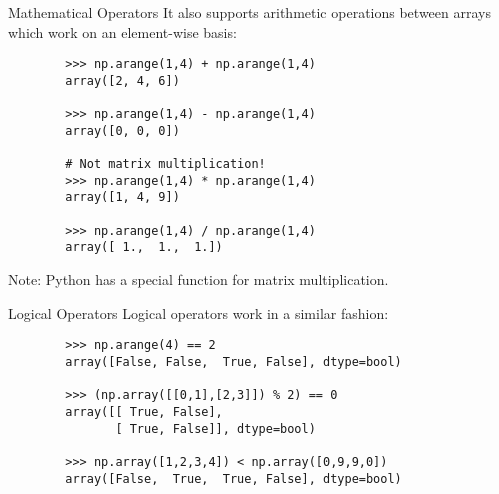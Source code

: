 \documentclass[serif,xcolor=pdftex,dvipsnames,table,hyperref={bookmarks=false,breaklinks}]{beamer}
\begin{document}
\begin{frame}[t,fragile]{Mathematical Operators}
	It also supports arithmetic operations between arrays which work on an element-wise basis:
	
	\pause
	\begin{lstlisting}
		>>> np.arange(1,4) + np.arange(1,4)
		array([2, 4, 6])
		
		>>> np.arange(1,4) - np.arange(1,4)
		array([0, 0, 0])
		
		# Not matrix multiplication!
		>>> np.arange(1,4) * np.arange(1,4)
		array([1, 4, 9])
		
		>>> np.arange(1,4) / np.arange(1,4)
		array([ 1.,  1.,  1.])
	\end{lstlisting}
	
	\pause
	Note: Python has a special function for matrix multiplication.
\end{frame}


\begin{frame}[t,fragile]{Logical Operators}
	Logical operators work in a similar fashion:
	
	\pause
	\begin{lstlisting}
		>>> np.arange(4) == 2
		array([False, False,  True, False], dtype=bool)
		
		>>> (np.array([[0,1],[2,3]]) % 2) == 0
		array([[ True, False],
		       [ True, False]], dtype=bool)
		
		>>> np.array([1,2,3,4]) < np.array([0,9,9,0])
		array([False,  True,  True, False], dtype=bool)
	\end{lstlisting}
\end{frame}

%
%
%
\end{document}
